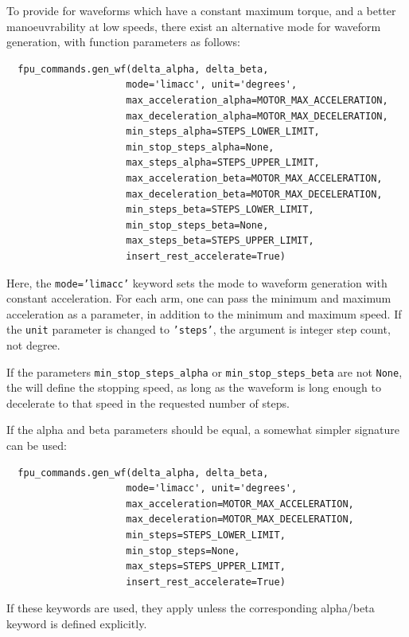 \documentclass[fontsize=12,a4paper]{scrreprt}
\begin{document}
To provide for waveforms which have a constant maximum torque, and a
better manoeuvrability at low speeds, there exist an alternative mode
for waveform generation, with function parameters as follows:

\begin{verbatim}
  fpu_commands.gen_wf(delta_alpha, delta_beta,
                     mode='limacc', unit='degrees',
                     max_acceleration_alpha=MOTOR_MAX_ACCELERATION,
                     max_deceleration_alpha=MOTOR_MAX_DECELERATION,
                     min_steps_alpha=STEPS_LOWER_LIMIT,
                     min_stop_steps_alpha=None,
                     max_steps_alpha=STEPS_UPPER_LIMIT,
                     max_acceleration_beta=MOTOR_MAX_ACCELERATION,
                     max_deceleration_beta=MOTOR_MAX_DECELERATION,
                     min_steps_beta=STEPS_LOWER_LIMIT,
                     min_stop_steps_beta=None,
                     max_steps_beta=STEPS_UPPER_LIMIT,
                     insert_rest_accelerate=True)
\end{verbatim}

Here, the \texttt{mode='limacc'} keyword sets the mode to waveform
generation with constant acceleration. For each arm, one can pass the
minimum and maximum acceleration as a parameter, in addition to the
minimum and maximum speed. If the \texttt{unit} parameter is changed
to \texttt{'steps'}, the argument is integer step count, not degree.

If the parameters \texttt{min\_stop\_steps\_alpha} or
\texttt{min\_stop\_steps\_beta} are not \texttt{None}, the will define
the stopping speed, as long as the waveform is long enough to
decelerate to that speed in the requested number of steps.

If the alpha and beta parameters should be equal, a somewhat
simpler signature can be used:

\begin{verbatim}
  fpu_commands.gen_wf(delta_alpha, delta_beta,
                     mode='limacc', unit='degrees',
                     max_acceleration=MOTOR_MAX_ACCELERATION,
                     max_deceleration=MOTOR_MAX_DECELERATION,
                     min_steps=STEPS_LOWER_LIMIT,
                     min_stop_steps=None,
                     max_steps=STEPS_UPPER_LIMIT,
                     insert_rest_accelerate=True)
\end{verbatim}

If these keywords are used, they apply unless the corresponding
alpha/beta keyword is defined explicitly.
\end{document}
